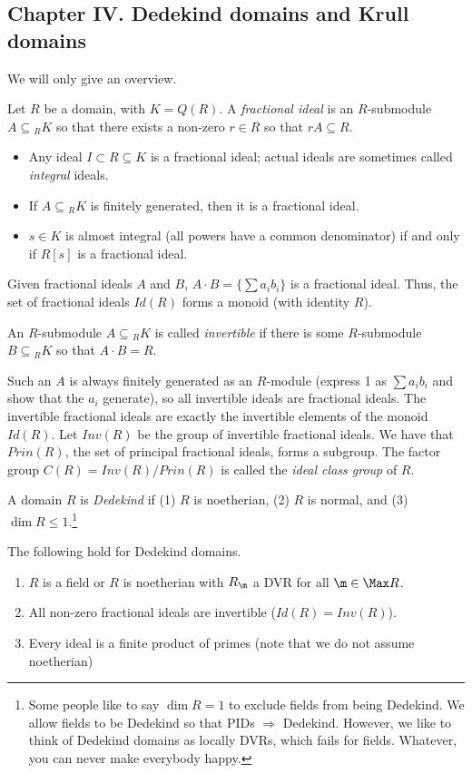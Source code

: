  \subsection{Chapter IV. Dedekind domains and Krull domains}
 We will only give an overview.

 Let $R$ be a domain, with $K=Q(R)$. A \emph{fractional ideal} is an $R$-submodule
 $A\subseteq {}_R K$ so that there exists a non-zero $r\in R$ so that $rA\subseteq R$.
 \begin{example}
   \begin{itemize}
   \item Any ideal $I\subset R\subseteq K$ is a fractional ideal; actual ideals are
   sometimes called \emph{integral} ideals.

   \item If $A\subseteq {}_R K$ is finitely generated, then it is a fractional ideal.

   \item $s\in K$ is almost integral (all powers have a common denominator) if and only
   if $R[s]$ is a fractional ideal.
   \end{itemize}
   \vspace*{-1.7\baselineskip}
 \end{example}
 Given fractional ideals $A$ and $B$, $A\cdot B=\{\sum a_ib_i\}$ is a fractional ideal.
 Thus, the set of fractional ideals $Id(R)$ forms a monoid (with identity $R$).
 \begin{definition}
   An $R$-submodule $A\subseteq {}_RK$ is called \emph{invertible} if there is some
   $R$-submodule $B\subseteq {}_RK$ so that $A\cdot B=R$.
 \end{definition}
 Such an $A$ is always finitely generated as an $R$-module (express 1 as $\sum a_ib_i$
 and show that the $a_i$ generate), so all invertible ideals are fractional ideals. The
 invertible fractional ideals are exactly the invertible elements of the monoid $Id(R)$.
 Let $Inv(R)$ be the group of invertible fractional ideals. We have that $Prin(R)$, the
 set of principal fractional ideals, forms a subgroup. The factor group
 $C(R)=Inv(R)/Prin(R)$ is called the \emph{ideal class group} of $R$.

 \begin{definition}
   A domain $R$ is \emph{Dedekind} if (1) $R$ is noetherian, (2) $R$ is normal, and (3)
   $\dim R\le 1$.\footnote{Some people like to say $\dim R=1$ to exclude fields from
   being Dedekind. We allow fields to be Dedekind so that PIDs $\Rightarrow$ Dedekind.
   However, we like to think of Dedekind domains as locally DVRs, which fails for fields.
   Whatever, you can never make everybody happy.}
 \end{definition}
 The following hold for Dedekind domains.
 \begin{enumerate}
   \item $R$ is a field or $R$ is noetherian with $R_\m$ a DVR for all $\m\in \Max R$.
   \item All non-zero fractional ideals are invertible ($Id(R)=Inv(R)$).
   \item Every ideal is a finite product of primes (note that we do not assume
   noetherian)
 \end{enumerate}
 \setcounter{lecture}{39}
